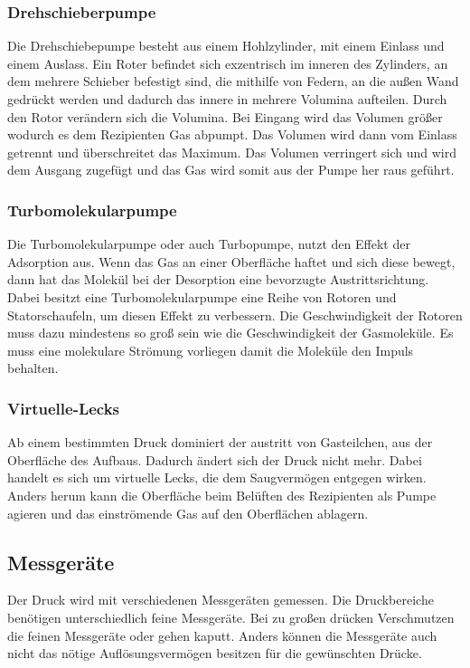 \subsubsection{Drehschieberpumpe}
Die Drehschiebepumpe besteht aus einem Hohlzylinder, mit einem Einlass und einem Auslass. Ein Roter befindet sich exzentrisch im inneren des Zylinders, an dem mehrere Schieber befestigt sind, die mithilfe von Federn, an die außen Wand gedrückt werden und dadurch das innere in mehrere Volumina aufteilen. Durch den Rotor verändern sich die Volumina. Bei Eingang wird das Volumen größer wodurch es dem Rezipienten Gas abpumpt. Das Volumen wird dann vom Einlass getrennt und überschreitet das Maximum. Das Volumen verringert sich  und wird dem Ausgang zugefügt und das Gas wird somit aus der Pumpe her raus geführt.

\subsubsection{Turbomolekularpumpe}
Die Turbomolekularpumpe oder auch Turbopumpe, nutzt den Effekt der Adsorption aus. Wenn das Gas an einer Oberfläche haftet und sich diese bewegt, dann hat das Molekül bei der Desorption eine bevorzugte Austrittsrichtung. Dabei besitzt eine Turbomolekularpumpe eine Reihe von Rotoren und Statorschaufeln, um diesen Effekt zu verbessern. Die Geschwindigkeit der Rotoren muss dazu mindestens so groß sein wie die Geschwindigkeit der Gasmoleküle. Es muss eine molekulare Strömung vorliegen damit die Moleküle den Impuls behalten.
\subsubsection{Virtuelle-Lecks}
Ab einem bestimmten Druck dominiert der austritt von Gasteilchen, aus der Oberfläche des Aufbaus. Dadurch ändert sich der Druck nicht mehr. Dabei handelt es sich um virtuelle Lecks, die dem Saugvermögen entgegen wirken. Anders herum kann die Oberfläche beim Belüften des Rezipienten als Pumpe agieren und das einströmende Gas auf den Oberflächen ablagern.
\subsection{Messgeräte}
Der Druck wird mit verschiedenen Messgeräten gemessen. Die Druckbereiche benötigen unterschiedlich feine Messgeräte. Bei zu großen drücken Verschmutzen die feinen Messgeräte oder gehen kaputt. Anders können die Messgeräte auch nicht das nötige Auflösungsvermögen besitzen für die gewünschten Drücke.
